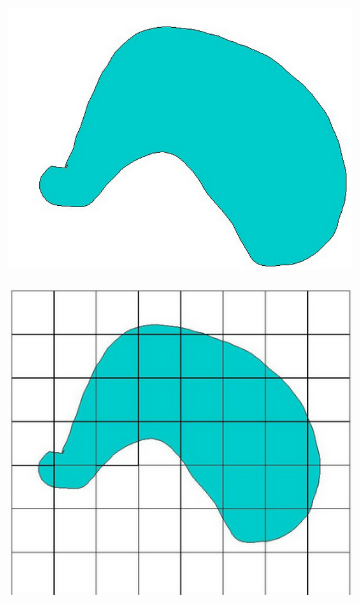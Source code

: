 \begin{figure}[!h]
	\caption{2D example of marching cube algorithm}
	\label{fig:MC}
	\begin{minipage}{.25\textwidth}
		\begin{subfigure}{\textwidth}
			\includegraphics[width=\textwidth]{figures/MC_img.png}
		\end{subfigure}
		\begin{subfigure}{\textwidth}
			\includegraphics[width=\textwidth]{figures/MC_grid.png}

\end{subfigure}
\end{minipage}
\end{figure}
